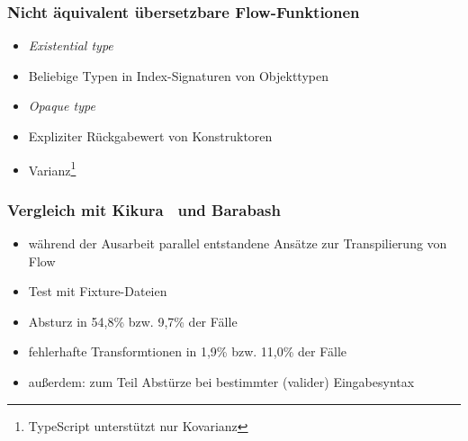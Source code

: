     \begin{frame}[noframenumbering]
      \frametitle{Nicht äquivalent übersetzbare Flow-Funktionen}
      \begin{itemize}
        \item \textit{Existential type}
        \item Beliebige Typen in Index-Signaturen von Objekttypen
        \item \textit{Opaque type}
        \item Expliziter Rückgabewert von Konstruktoren
        \item Varianz\footnote{TypeScript unterstützt nur Kovarianz}
      \end{itemize}
    \end{frame}

    \begin{frame}[noframenumbering]
      \frametitle{Vergleich mit Kikura~\autocite{KIKURA} und Barabash~\autocite{BARABASH}}
      \begin{itemize}
        \item während der Ausarbeit parallel entstandene Ansätze zur Transpilierung von Flow
        \item Test mit Fixture-Dateien
        \item Absturz in 54,8\% bzw. 9,7\% der Fälle
        \item fehlerhafte Transformtionen in 1,9\% bzw. 11,0\% der Fälle
        \item außerdem: zum Teil Abstürze bei bestimmter (valider) Eingabesyntax
      \end{itemize}
    \end{frame}

